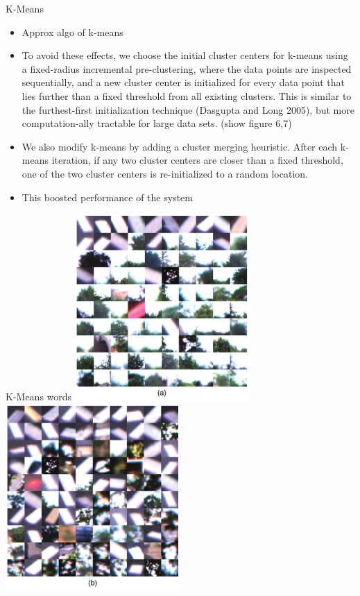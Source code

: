 \begin{frame}{K-Means}
    \begin{itemize}
        \item Approx algo of k-means
        \item To avoid these effects, we choose the initial cluster centers for k-means using a fixed-radius incremental pre-clustering, where the data points are inspected sequentially, and a new cluster center is initialized for every data point that lies further than a fixed threshold from all existing clusters. This is similar to the furthest-first initialization technique (Dasgupta and Long 2005), but more computation-ally tractable for large data sets. (show figure 6,7)
        \item We also modify k-means by adding a cluster merging heuristic. After each k-means iteration, if any two cluster centers are closer than a fixed threshold, one of the two cluster centers is re-initialized to a random location.
        \item This boosted performance of the system
    \end{itemize}
\end{frame}

\begin{frame}{K-Means words}
    \includegraphics[width=0.5\textwidth]{./media/words_fabmap2a.png}
    \includegraphics[width=0.5\textwidth]{./media/words_fabmap2b.png}
\end{frame}

